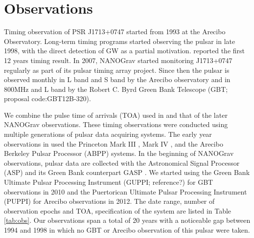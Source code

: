 \section{Observations}
Timing observation of PSR J1713+0747 started from 1993 at the Arecibo
Observatory. Long-term timing programs started observing the pulsar in late 1998, with the direct detection of GW as a partial motivation. \citet{sns+05} reported the first 12 years timing result. In 2007, NANOGrav started monitoring  J1713+0747 regularly as part
of  its pulsar timing array project. Since then the pulsar is observed monthly
in L band and S band by the Arecibo
observatory and in 800MHz and L band by the Robert C. Byrd Green Bank
Telescope (GBT; proposal code:GBT12B-320).

We combine the pulse time of arrivals (TOA) used in \citealt{sns+05} and that
of the later NANOGrav observations. These timing observations were conducted 
using multiple generations of pulsar data acquiring systems. The early year
observations in \citet{sns+05} used
 the Princeton Mark III \citep{skn+92}, Mark IV
\citep{sst+00}, and the Arecibo Berkeley Pulsar Processor (ABPP) systems. 
In the beginning of NANOGrav observations, pulsar data are collected with the Astronomical Signal
Processor (ASP) and its Green Bank counterpart GASP \citep{dem07}. We
started using 
the Green Bank Ultimate Pulsar Processing Instrument (GUPPI; reference?) for GBT 
observations in 2010 and the Puertorican Ultimate Pulsar Processing Instrument
(PUPPI) for Arecibo observations in 2012. 
The date range, number of observation epochs and TOA, specification of the
system are listed in Table \ref{tab:obs}.
Our observations span a total of 20 years with a noticeable gap between 1994
and 1998 in which no GBT or Arecibo observation of this pulsar were taken. 


